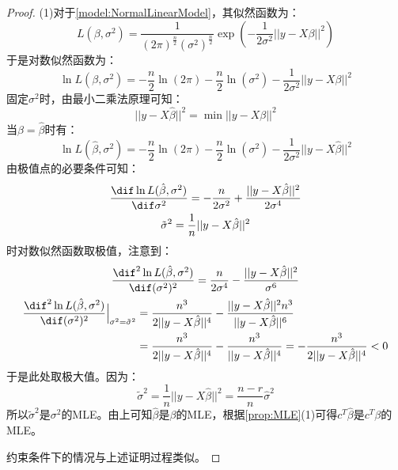 \begin{proof}
	(1)对于\cref{model:NormalLinearModel}，其似然函数为：
	\begin{equation*}
		L(\beta,\sigma^2)=\frac{1}{(2\pi)^{\frac{n}{2}}(\sigma^2)^\frac{n}{2}}\exp\left(-\frac{1}{2\sigma^2}||y-X\beta||^2\right)
	\end{equation*}
	于是对数似然函数为：
	\begin{equation*}
		\ln L(\beta,\sigma^2)=-\frac{n}{2}\ln(2\pi)-\frac{n}{2}\ln(\sigma^2)-\frac{1}{2\sigma^2}||y-X\beta||^2
	\end{equation*}
	固定$\sigma^2$时，由最小二乘法原理可知：
	\begin{equation*}
		||y-X\hat{\beta}||^2=\min||y-X\beta||^2
	\end{equation*}
	当$\beta=\hat{\beta}$时有：
	\begin{equation*}
		\ln L(\hat{\beta},\sigma^2)=-\frac{n}{2}\ln(2\pi)-\frac{n}{2}\ln(\sigma^2)-\frac{1}{2\sigma^2}||y-X\hat{\beta}||^2
	\end{equation*}
	由极值点的必要条件可知：
	\begin{gather*}
		\frac{\dif\ln L(\hat{\beta},\sigma^2)}{\dif \sigma^2}=-\frac{n}{2\sigma^2}+\frac{||y-X\hat{\beta}||^2}{2\sigma^4} \\
		\tilde{\sigma}^2=\frac{1}{n}||y-X\hat{\beta}||^2
	\end{gather*}
	时对数似然函数取极值，注意到：
	\begin{gather*}
		\frac{\dif^2\ln L(\hat{\beta},\sigma^2)}{\dif (\sigma^2)^2}=\frac{n}{2\sigma^4}-\frac{||y-X\hat{\beta}||^2}{\sigma^6} \\
		\begin{aligned}
			\frac{\dif^2\ln L(\hat{\beta},\sigma^2)}{\dif (\sigma^2)^2}\Big|_{\sigma^2=\tilde{\sigma}^2}&=\frac{n^3}{2||y-X\hat{\beta}||^4}-\frac{||y-X\hat{\beta}||^2n^3}{||y-X\hat{\beta}||^6} \\
			&=\frac{n^3}{2||y-X\hat{\beta}||^4}-\frac{n^3}{||y-X\hat{\beta}||^4}=-\frac{n^3}{2||y-X\hat{\beta}||^4}<0
		\end{aligned}
	\end{gather*}
	于是此处取极大值。因为：
	\begin{equation*}
		\tilde{\sigma}^2=\frac{1}{n}||y-X\hat{\beta}||^2=\frac{n-r}{n}\hat{\sigma}^2
	\end{equation*}
	所以$\tilde{\sigma}^2$是$\sigma^2$的MLE。由上可知$\hat{\beta}$是$\beta$的MLE，根据\cref{prop:MLE}(1)可得$c^T\hat{\beta}$是$c^T\beta$的MLE。\par
	约束条件下的情况与上述证明过程类似。\par

\end{proof}
